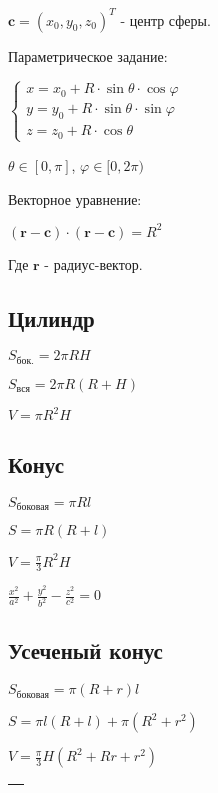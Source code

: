 $ \boldsymbol{c} = (x_0, y_0, z_0)^T $ - центр сферы.

Параметрическое задание:

$\begin{cases}
	x = x_0 + R\cdot \sin\theta \cdot \cos \varphi \\
	y = y_0 + R\cdot \sin\theta \cdot \sin \varphi \\
	z = z_0 + R\cdot \cos\theta
\end{cases} $

$ \theta \in [0, \pi] $, $ \varphi \in [0, 2\pi) $

Векторное уравнение:

$ (\boldsymbol{r} - \boldsymbol{c})\cdot (\boldsymbol{r} - \boldsymbol{c}) = R^2 $

Где $\boldsymbol{r}$ - радиус-вектор. 

\subsection{Цилиндр}

$ S_\text{бок.} = 2 \pi R H $

$ S_\text{вся} = 2 \pi R (R+H) $

$ V = \pi R^2 H $

\subsection{Конус}

$ S_{\text{боковая}} = \pi R l $

$ S = \pi R (R + l) $

$ V = \frac{\pi}{3} R^2 H $

$ \frac{x^2}{a^2} + \frac{y^2}{b^2} - \frac{z^2}{c^2} = 0 $

\subsection{Усеченый конус}

$ S_{\text{боковая}} = \pi (R+r) l $

$ S = \pi l (R + l) + \pi (R^2 + r^2) $

$ V = \frac{\pi}{3} H (R^2 + Rr + r^2) $


\begin{tabu}[t]{||c|c||}
	\hline
		 \\
	\hline
	\hline
	\hline
	\hline
	\hline
	\hline
	\hline
	\hline
\end{tabu}

